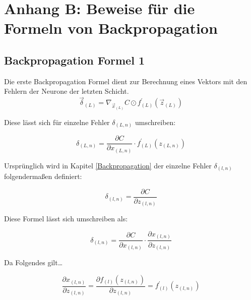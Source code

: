 \documentclass[a4paper,12pt,ngerman,oneside]{scrreprt}	%
\begin{document}
		\newpage
		\vspace*{2cm}	
		\section*{Anhang B: Beweise für die Formeln von Backpropagation}
			\subsection*{Backpropagation Formel 1}
			Die erste Backpropagation Formel dient zur Berechnung eines Vektors mit den Fehlern der Neurone der letzten Schicht.
			\begin{equation}
			\vec{\delta}_{(L)} = \nabla_{\vec{x}_{(L)}}C \odot f_{(L)}^{\prime} (\vec{z}_{(L)})
			\end{equation}
			
			Diese lässt sich für einzelne Fehler $\delta_{(L,n)}$ umschreiben:
			
			\begin{equation}\label{Beweis1Formel2}
				\delta_{(L,n)} = \frac{\partial C}{\partial x_{(L,n)}} \cdot f_{(L)}^{\prime} (z_{(L,n)})
			\end{equation}
			
			Ursprünglich wird in Kapitel \ref{Backpropagation} der einzelne Fehler $\delta_{(l,n)}$ folgendermaßen definiert:
			
			\begin{equation}
				\delta_{(l,n)} = \frac{\partial C}{\partial z_{(l,n)}}
			\end{equation}
			
			Diese Formel lässt sich umschreiben als:
			
			\begin{equation}\label{Beweis1Formel1}
				\delta_{(l,n)} = \frac{\partial C}{\partial x_{(l,n)}} \cdot \frac{\partial x_{(l,n)}}{\partial z_{(l,n)}}
			\end{equation}
			
			Da Folgendes gilt…
			
			\begin{equation}
				\frac{\partial x_{(l,n)}}{\partial z_{(l,n)}} = \frac{\partial f_{(l)}(z_{(l,n)})}{\partial z_{(l,n)}} = f_{(l)}^{\prime} (z_{(l,n)})
			\end{equation}			
			
\end{document}
